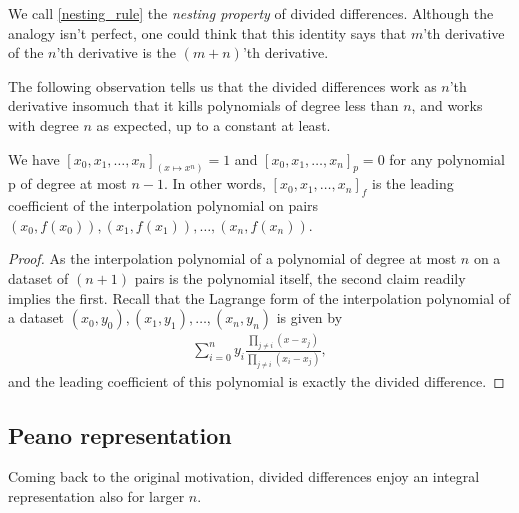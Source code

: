 We call \ref{nesting_rule} the \textit{nesting property} of divided differences. Although the analogy isn't perfect, one could think that this identity says that $m$'th derivative of the $n$'th derivative is the $(m + n)$'th derivative. 

The following observation tells us that the divided differences work as $n$'th derivative insomuch that it kills polynomials of degree less than $n$, and works with degree $n$ as expected, up to a constant at least.

\begin{prop}\label{lagrange_divided}
We have $[x_{0}, x_{1}, \ldots, x_{n}]_{(x \mapsto x^{n})} = 1$ and $[x_{0}, x_{1}, \ldots, x_{n}]_{p} = 0$ for any polynomial p of degree at most $n - 1$. In other words, $[x_{0}, x_{1}, \ldots, x_{n}]_{f}$ is the leading coefficient of the interpolation polynomial on pairs $(x_{0}, f(x_{0})), (x_{1}, f(x_{1})), \ldots, (x_{n}, f(x_{n}))$.
\end{prop}
\begin{proof}
	As the interpolation polynomial of a polynomial of degree at most $n$ on a dataset of $(n + 1)$ pairs is the polynomial itself, the second claim readily implies the first. Recall that the Lagrange form of the interpolation polynomial of a dataset $(x_{0}, y_{0}), (x_{1}, y_{1}), \ldots, (x_{n}, y_{n})$ is given by
	\begin{align*}
		\sum_{i = 0}^{n} y_{i} \frac{\prod_{j \neq i}(x - x_{j})}{\prod_{j \neq i}(x_{i} - x_{j})},
	\end{align*}
	and the leading coefficient of this polynomial is exactly the divided difference.
\end{proof}

\subsection{Peano representation}

Coming back to the original motivation, divided differences enjoy an integral representation also for larger $n$.

